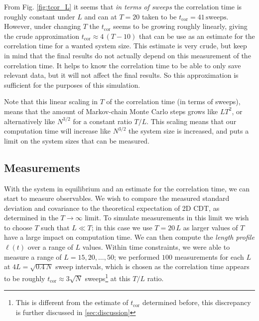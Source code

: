From Fig. \ref{fig:tcor_L} it seems that \emph{in terms of sweeps} the correlation time is roughly constant under $L$ and can at $T = 20$ taken to be $t_\text{cor} = 41 \, \text{sweeps}$.
However, under changing $T$ the $t_\text{cor}$ seems to be growing roughly linearly, giving the crude approximation $t_\text{cor} \approx 4\, (T - 10)$ that can be use as an estimate for the correlation time for a wanted system size.
This estimate is very crude, but keep in mind that the final results do not actually depend on this measurement of the correlation time. It helps to know the correlation time to be able to only save relevant data, but it will not affect the final results.
So this approximation is sufficient for the purposes of this simulation.

Note that this linear scaling in $T$ of the correlation time (in terms of sweeps), means that the amount of Markov-chain Monte Carlo steps grows like $LT^2$, or alternatively like $N^{3/2}$ for a constant ratio $T/L$. This scaling means that our computation time will increase like $N^{3/2}$ the system size is increased, and puts a limit on the system sizes that can be measured.


\subsection{Measurements}
With the system in equilibrium and an estimate for the correlation time, we can start to measure observables.
We wish to compare the measured standard deviation and covariance to the theoretical expectation of 2D CDT, as determined in the $T \rightarrow \infty$ limit.
To simulate measurements in this limit we wish to choose $T$ such that $L \ll T$; in this case we use $T = 20 \, L$ as larger values of $T$ have a large impact on computation time.
We can then compute the \emph{length profile} $\ell(t)$ over a range of $L$ values.
Within time constraints, we were able to measure a range of $L = 15, 20, \dots, 50$; we performed $100$ measurements for each $L$ at $ 4 L = \sqrt{0.4 \, N}$ sweep intervals, which is chosen as the correlation time appears to be roughly $t_\text{cor} \approx 3 \sqrt{N}$ sweeps\footnote{This is different from the estimate of $t_\text{cor}$ determined before, this discrepancy is further discussed in \ref{sec:discussion}} at this $T/L$ ratio.

